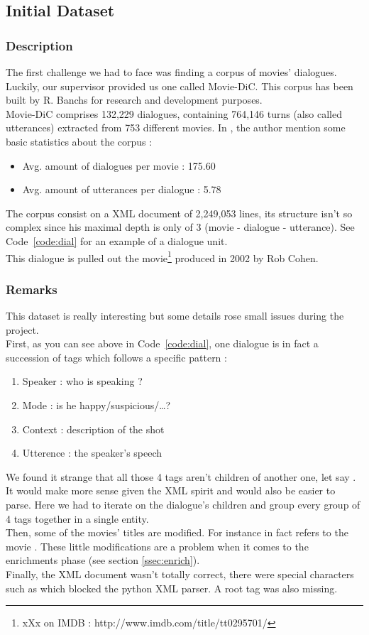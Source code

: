 \subsection{Initial Dataset}
\subsubsection{Description}
The first challenge we had to face was finding a corpus of movies' dialogues. Luckily, our supervisor provided us one called Movie-DiC. This corpus has been built by R. Banchs \cite{banchs} for research and development purposes.\\
Movie-DiC comprises 132,229 dialogues, containing 764,146 turns (also called utterances) extracted from 753 different movies. In \cite{banchs}, the author mention some basic statistics about the corpus :
\begin{itemize}
\item Avg. amount of dialogues per movie : 175.60
\item Avg. amount of utterances per dialogue : 5.78
\end{itemize}
The corpus consist on a XML document of 2,249,053 lines, its structure isn't so complex since his maximal depth is only of 3 (movie - dialogue - utterance). See Code~\ref{code:dial} for an example of a dialogue unit.\\

This dialogue is pulled out the  movie\footnote{xXx on IMDB : http://www.imdb.com/title/tt0295701/} produced in 2002 by Rob Cohen.
\subsubsection{Remarks}
This dataset is really interesting but some details rose small issues during the project.\\
First, as you can see above in Code~\ref{code:dial}, one dialogue is in fact a succession of tags which follows a specific pattern :
\begin{enumerate}
\item Speaker : who is speaking ?
\item Mode : is he happy/suspicious/\dots ?
\item Context : description of the shot
\item Utterence : the speaker's speech
\end{enumerate}
We found it strange that all those 4 tags aren't children of another one, let say . It would make more sense given the XML spirit and would also be easier to parse. Here we had to iterate on the dialogue's children and group every group of 4 tags together in a single entity.\\
Then, some of the movies' titles are modified. For instance  in fact refers to the movie . These little modifications are a problem when it comes to the enrichments phase (see section \ref{ssec:enrich}). \\
Finally, the XML document wasn't totally correct, there were special characters such as \say{\&} which blocked the python XML parser. A root tag was also missing.

